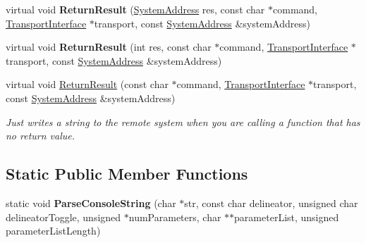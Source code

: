 \begin{DoxyCompactItemize}
\item 
\hypertarget{class_rak_net_1_1_command_parser_interface_a5ebeb5082e99589ebd50c88716014465}{virtual void {\bfseries Return\-Result} (\hyperlink{struct_rak_net_1_1_system_address}{System\-Address} res, const char $\ast$command, \hyperlink{class_rak_net_1_1_transport_interface}{Transport\-Interface} $\ast$transport, const \hyperlink{struct_rak_net_1_1_system_address}{System\-Address} \&system\-Address)}\label{class_rak_net_1_1_command_parser_interface_a5ebeb5082e99589ebd50c88716014465}

\item 
\hypertarget{class_rak_net_1_1_command_parser_interface_a4799f901b346c36631ad20c60562e75b}{virtual void {\bfseries Return\-Result} (int res, const char $\ast$command, \hyperlink{class_rak_net_1_1_transport_interface}{Transport\-Interface} $\ast$transport, const \hyperlink{struct_rak_net_1_1_system_address}{System\-Address} \&system\-Address)}\label{class_rak_net_1_1_command_parser_interface_a4799f901b346c36631ad20c60562e75b}

\item 
virtual void \hyperlink{class_rak_net_1_1_command_parser_interface_a628e6ddfdeaecfb7d6120f7db3780d91}{Return\-Result} (const char $\ast$command, \hyperlink{class_rak_net_1_1_transport_interface}{Transport\-Interface} $\ast$transport, const \hyperlink{struct_rak_net_1_1_system_address}{System\-Address} \&system\-Address)
\begin{DoxyCompactList}\small\item\em Just writes a string to the remote system when you are calling a function that has no return value. \end{DoxyCompactList}\end{DoxyCompactItemize}
\subsection*{Static Public Member Functions}
\begin{DoxyCompactItemize}
\item 
\hypertarget{class_rak_net_1_1_command_parser_interface_aa1ab14246a6e7531aefcdbf49fbca042}{static void {\bfseries Parse\-Console\-String} (char $\ast$str, const char delineator, unsigned char delineator\-Toggle, unsigned $\ast$num\-Parameters, char $\ast$$\ast$parameter\-List, unsigned parameter\-List\-Length)}\label{class_rak_net_1_1_command_parser_interface_aa1ab14246a6e7531aefcdbf49fbca042}

\end{DoxyCompactItemize}
